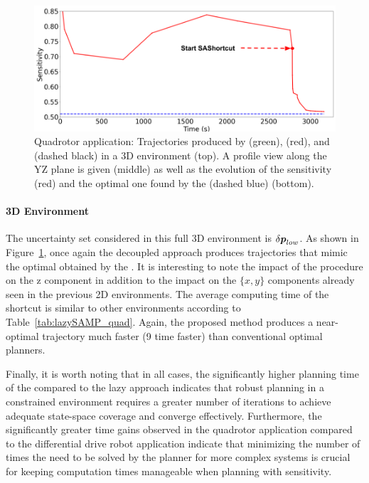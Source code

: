 \begin{figure}[h!]
\begin{minipage}{0.48\linewidth}
        \includegraphics[width=\linewidth]{figures/samp/3D_sensi.png}
    \end{minipage}
    \caption{Quadrotor application: Trajectories produced by  (green),  (red), and  (dashed black) in a 3D environment (top). 
    A profile view along the YZ plane is given (middle) as well as the evolution of the sensitivity (red) and the optimal one found by the  (dashed blue) (bottom).}
    \label{fig:3D}
\end{figure}

\paragraph{3D Environment} 

The uncertainty set considered in this full 3D environment is $\delta\boldsymbol{p}_{low}$.
As shown in Figure~\ref{fig:3D}, once again the decoupled approach produces trajectories that mimic the optimal obtained by the .
It is interesting to note the impact of the  procedure on the z component in addition to the impact on the $\{x,y\}$ components already seen in the previous 2D environments.
The average computing time of the shortcut is similar to other environments according to Table~\ref{tab:lazySAMP_quad}.
Again, the proposed method produces a near-optimal trajectory much faster (9 time faster) than conventional optimal planners.

Finally, it is worth noting that in all cases, the significantly higher planning time of the  compared to the lazy approach indicates that robust planning in a constrained environment requires a greater number of iterations to achieve adequate state-space coverage and converge effectively.
Furthermore, the significantly greater time gains observed in the quadrotor application compared to the differential drive robot application indicate that minimizing the number of times the  need to be solved by the planner for more complex systems is crucial for keeping computation times manageable when planning with sensitivity.

